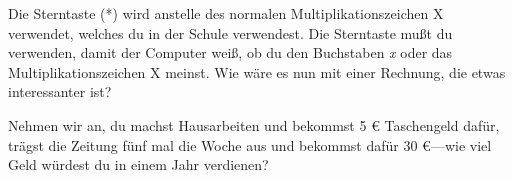 Die Sterntaste (*) wird anstelle des normalen Multiplikationszeichen \textsf{X} verwendet, welches du in der Schule verwendest. Die Sterntaste mußt du verwenden, damit der Computer weiß, ob du den Buchstaben \emph{x} oder das Multiplikationszeichen \textsf{X} meinst. Wie wäre es nun mit einer Rechnung, die etwas interessanter ist?

Nehmen wir an, du machst Hausarbeiten und bekommst 5 € Taschengeld dafür, trägst die Zeitung fünf mal die Woche aus und bekommst dafür $30$ €---wie viel Geld würdest du in einem Jahr verdienen?

